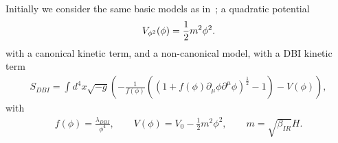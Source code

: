 Initially we consider the same basic models as in~\cite{Funakoshi};
a quadratic potential
\begin{align}\label{eq:quadratic_potential}
    V_{\phi^2}(\phi) = \frac{1}{2}m^2\phi^2.
\end{align}
with a canonical kinetic term,
and a non-canonical model, with a DBI
kinetic term
\begin{align}\label{eq:dbi_action}
    S_{DBI}=\int d^4x\sqrt{-g}\left(-\frac{1}{f(\phi)}\left(\left(1+f(\phi)\partial_\mu\phi\partial^\mu\phi\right)^{\frac{1}{2}}-1\right)-V(\phi)\right),
\end{align}
with
\begin{align}\label{eq:dbi_warp}
    f(\phi)=\frac{\lambda_{DBI}}{\phi^4},\qquad
    V(\phi)=V_0-\frac{1}{2}m^2\phi^2,\qquad
    m=\sqrt{\beta_{IR}}H.
\end{align}

